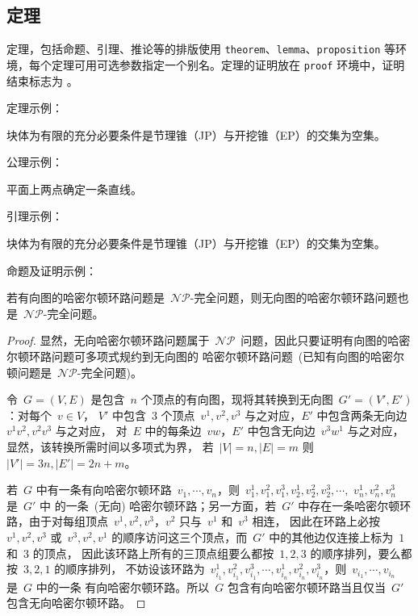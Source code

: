 \subsection{定理}
定理，包括命题、引理、推论等的排版使用 \texttt{theorem}、\texttt{lemma}、\texttt{proposition} 等环境，每个定理可用可选参数指定一个别名。定理的证明放在 \texttt{proof} 环境中，证明结束标志为 。

定理示例：
\begin{theorem}[有限性定理] \label{thm:samples:t}
块体为有限的充分必要条件是节理锥（JP）与开挖锥（EP）的交集为空集。
\end{theorem}

公理示例：
\begin{axiom} \label{thm:samples:a}
平面上两点确定一条直线。
\end{axiom}

引理示例：
\begin{lemma} \label{thm:samples:l}
块体为有限的充分必要条件是节理锥（JP）与开挖锥（EP）的交集为空集。
\end{lemma}

命题及证明示例：
\newcommand{\sNP}{\ensuremath{\mathcal{NP}}}
\newcommand{\tNP}{\sNP\ }
\newcommand{\tNPC}{\mbox{\ensuremath{\mathcal{NP}\text{-完全}}}}
\begin{proposition} \label{thm:samples:p}
若有向图的哈密尔顿环路问题是~\tNPC 问题，则无向图的哈密尔顿环路问题也是~\tNPC 问题。
\end{proposition}

\begin{proof}
    显然，无向哈密尔顿环路问题属于~\tNP 问题，因此只要证明有向图的哈密尔顿环路问题可多项式规约到无向图的
    哈密尔顿环路问题~(已知有向图的哈密尔顿问题是~\tNPC 问题)。

    令~$G=(V,E)$ 是包含~$n$ 个顶点的有向图，现将其转换到无向图~$G'=(V',E')$：对每个~$v\in V$，
    $V'$ 中包含~$3$ 个顶点~$v^1,v^2,v^3$ 与之对应，$E'$ 中包含两条无向边~$v^1v^2,v^2v^3$ 与之对应，
    对~$E$ 中的每条边~$vw$，$E'$ 中包含无向边~$v^3w^1$ 与之对应，显然，该转换所需时间以多项式为界，
    若~$|V|=n,|E|=m$ 则~$|V'|=3n,|E'|=2n+m$。

    若~$G$ 中有一条有向哈密尔顿环路~$v_1,\cdots,v_n$，则~$v_1^1,v_1^2,v_1^3,v_2^1,v_2^2,v_2^3,\cdots,$ $v_n^1,v_n^2,v_n^3$ 是~$G'$ 中
    的一条~(无向) 哈密尔顿环路；另一方面，若~$G'$ 中存在一条哈密尔顿环路，由于对每组顶点~$v^1,v^2,v^3$，$v^2$ 只与~$v^1$ 和~$v^3$ 相连，
    因此在环路上必按~$v^1,v^2,v^3$ 或~$v^3,v^2,v^1$ 的顺序访问这三个顶点，而~$G'$ 中的其他边仅连接上标为~$1$ 和~$3$ 的顶点，
    因此该环路上所有的三顶点组要么都按~$1,2,3$ 的顺序排列，要么都按~$3,2,1$ 的顺序排列，
    不妨设该环路为~$v_{i_1}^1,v_{i_1}^2,v_{i_1}^3,\cdots,v_{i_n}^1,v_{i_n}^2,v_{i_n}^3$，则~$v_{i_1},\cdots,v_{i_n}$ 是~$G$ 中的一条
    有向哈密尔顿环路。所以~$G$ 包含有向哈密尔顿环路当且仅当~$G'$ 包含无向哈密尔顿环路。\qedhere
\end{proof}

